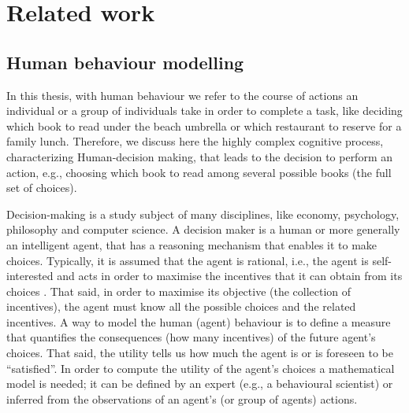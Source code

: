 
\chapter{Related work}

\ifpdf
\graphicspath{{Chapter2/Figs/Raster/}{Chapter2/Figs/PDF/}{Chapter2/Figs/}}
\else
\graphicspath{{Chapter2/Figs/Vector/}{Chapter2/Figs/}}
\fi

\section{Human behaviour modelling}


\label{sec:human_behaviour_modelling}
In this thesis, with human behaviour we refer to the course of actions an individual or a group of individuals take in order to complete a task, like deciding which book to read under the beach umbrella or which restaurant to reserve for a family lunch. Therefore, we discuss here the highly complex cognitive process, characterizing Human-decision making, that leads to the decision to perform an action, e.g., choosing which book to read among several possible books (the full set of choices).

Decision-making is a study subject of many disciplines, like economy, psychology, philosophy and computer science. A decision maker is a human or more generally an intelligent agent, that has a reasoning mechanism that enables it to make choices. Typically, it is assumed that the agent is rational, i.e., the agent is self-interested and acts in order to maximise the incentives 
that it can obtain from its choices \cite{decisionmaking:Kahneman,rational:utility:def}. That said, in order to maximise its objective (the collection of incentives), the agent must know all the possible choices and the related incentives. 
A way to model the human (agent) 
behaviour is to define a measure that quantifies the consequences (how many incentives)
of the future agent's choices. 
That said, the utility tells us how much the agent is or is foreseen to be ``satisfied''. 
In order to compute the utility of the agent's choices a mathematical model is needed; it can be defined by an expert (e.g., a behavioural scientist) or inferred from the observations of an agent's (or group of agents) actions.

